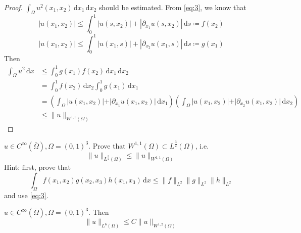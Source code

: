 \documentclass{report}
\begin{document}
\begin{proof}
    \(\int_{\Omega} u^{2}(x_1, x_2) \,\mathrm{d}x_1 \,\mathrm{d}x_2\) should be estimated. From \ref{eq:3}, we know that 
    \[\vert u(x_1, x_2) \vert \leq \int_{0}^{1} \vert u(s, x_2) \vert + |\partial_{x_1} u(s, x_2)| \,\mathrm{d}s \coloneqq f(x_2)\]
    \[\vert u(x_1, x_2) \vert \leq \int_{0}^{1} \vert u(x_1, s) \vert + |\partial_{x_2} u(x_1, s)| \,\mathrm{d}s \coloneqq g(x_1)\]
    Then 
    \begin{align*}
        \int_{\Omega} u^2 \,\mathrm{d}x &\leq \int_{0}^{1} g(x_1)f(x_2) \,\mathrm{d}x_1 \,\mathrm{d}x_2 \\
        &= \int_{0}^{1} f(x_2) \,\mathrm{d}x_2 \int_{0}^{1} g(x_1) \,\mathrm{d}x_1 \\
        &= \left(\int_{\Omega} \vert u(x_1, x_2) \vert + \vert \partial_{x_1} u(x_1, x_2) \vert \,\mathrm{d}x_1 \right) \left(\int_{\Omega} \vert u(x_1, x_2) \vert + \vert \partial_{x_2} u(x_1, x_2) \vert \,\mathrm{d}x_2 \right) \\
        &\leq \|u\|_{W^{1, 1}(\Omega)}
    \end{align*}
\end{proof}

{
    \(u \in C^{\infty}(\bar{\Omega}), \Omega = (0,1)^3\). Prove that \(W^{1, 1}(\Omega) \subset L^{\frac{3}{2}}(\Omega)\), i.e.
    \begin{equation}\label{eq:4}
        \|u\|_{L^{\frac{3}{2}}(\Omega)} \leq \|u\|_{W^{1, 1}(\Omega)}
    \end{equation}
    Hint: first, prove that
    \[\int_{\Omega} f(x_1, x_2)g(x_2, x_3)h(x_1, x_3) \,\mathrm{d}x \leq \|f\|_{L^{2}} \|g\|_{L^{2}} \|h\|_{L^{2}}\]
    and use \ref{eq:3}.
}

\ex{}
{
    \(u \in C^{\infty}(\bar{\Omega}), \Omega = (0,1)^3\). Then 
    \begin{equation}
        \|u\|_{L^{6}(\Omega)} \leq C \|u\|_{W^{1, 2}(\Omega)}
    \end{equation}
}
\end{document}
